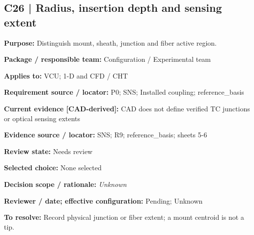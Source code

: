 \documentclass[11pt]{article}
\begin{document}
\par\noindent\begin{minipage}{\textwidth}\small\setlength{\parskip}{2pt}
\subsection*{C26 | Radius, insertion depth and sensing extent}
\textbf{Purpose:} Distinguish mount, sheath, junction and fiber active region.\par
\textbf{Package / responsible team:} Configuration / Experimental team\par
\textbf{Applies to:} VCU; 1-D and CFD / CHT\par
\textbf{Requirement source / locator:} P0; SNS; Installed coupling; reference\_\allowbreak{}basis\par
\textbf{Current evidence [CAD-derived]:} CAD does not define verified TC junctions or optical sensing extents\par
\textbf{Evidence source / locator:} SNS; R9; reference\_\allowbreak{}basis; sheets 5-6\par
\textbf{Review state:} Needs review\par
\textbf{Selected choice:} None selected\par
\textbf{Decision scope / rationale:} \textit{Unknown}\par
\textbf{Reviewer / date; effective configuration:} Pending; Unknown\par
\textbf{To resolve:} Record physical junction or fiber extent; a mount centroid is not a tip.\par
\end{minipage}\par\vspace{5pt}
\end{document}
